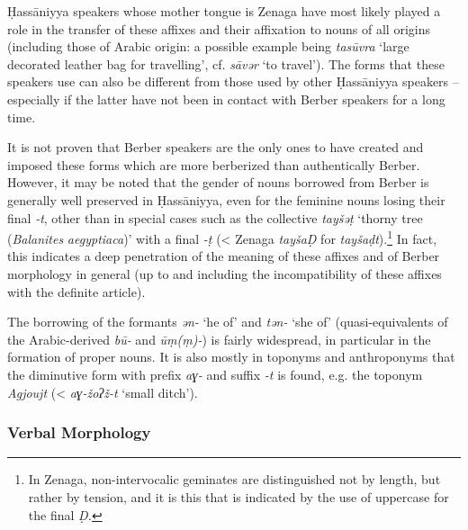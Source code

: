 \documentclass[output=paper]{langsci/langscibook}
\begin{document}
Ḥassāniyya speakers whose mother tongue is Zenaga have most likely played a role in the transfer of these affixes and their affixation to nouns of all origins (including those of Arabic origin: a possible example being \textit{tasūvra} ‘large decorated leather bag for travelling’, cf. \textit{sāvər} ‘to travel’). The forms that these speakers use can also be different from those used by other Ḥassāniyya speakers – especially if the latter have not been in contact with Berber speakers for a long time. 

It is not proven that Berber speakers are the only ones to have created and imposed these forms which are more berberized than authentically Berber. However, it may be noted that the gender of nouns borrowed from Berber is generally well preserved in Ḥassāniyya, even for the feminine nouns losing their final \textit{{}-t}, other than in special cases such as the collective \textit{tayšəṭ} ‘thorny tree (\textit{Balanites} \textit{aegyptiaca})’ with a final \textit{{}-ṭ} (< Zenaga \textit{tayšaḌ} for \textit{tayšaḍt}).\footnote{In Zenaga, non-intervocalic geminates are distinguished not by length, but rather by tension, and it is this that is indicated by the use of uppercase for the final \textit{Ḍ.} } In fact, this indicates a deep penetration of the meaning of these affixes and of Berber morphology in general (up to and including the incompatibility of these affixes with the definite article). 

The borrowing of the formants \textit{ən-} ‘he of’ and \textit{tən-} ‘she of’ (quasi-equivalents of the Arabic-derived \textit{bū-} and \textit{ūṃ(ṃ)-}) is fairly widespread, in particular in the formation of proper nouns. It is also mostly in toponyms and anthroponyms that the diminutive form with prefix \textit{aɣ-} and suffix \textit{{}-t} is found, e.g. the toponym \textit{Agjoujt} (< \textit{aɣ-žoʔž-t} ‘small ditch’).

\subsubsection{ Verbal Morphology} %

\label{sa}
\end{document}
